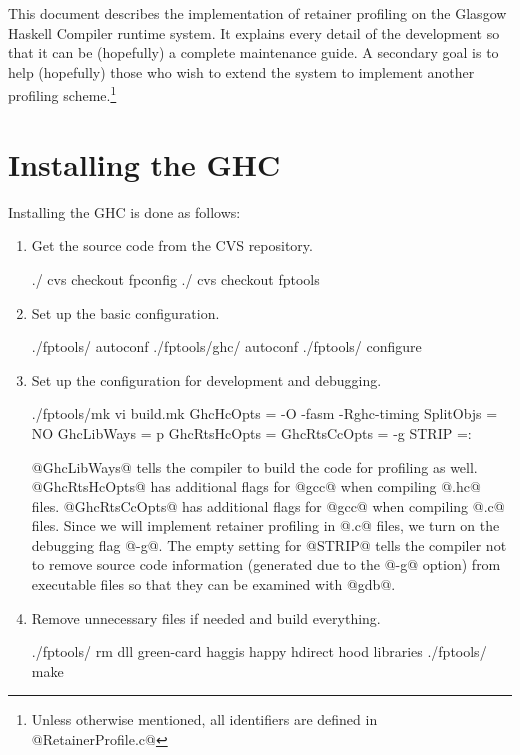 \documentclass{article}
\begin{document}
This document describes the implementation of retainer profiling on
the Glasgow Haskell Compiler runtime system. 
It explains every detail of the development so that it can be (hopefully)
a complete maintenance guide.
A secondary goal is to help (hopefully) those who wish to extend the system 
to implement another profiling scheme.\footnote{Unless otherwise mentioned,
all identifiers are defined in @RetainerProfile.c@}

\section{Installing the GHC}

Installing the GHC is done as follows:

\begin{enumerate}
\item Get the source code from the CVS repository.
\begin{code}
./              cvs checkout fpconfig
./              cvs checkout fptools
\end{code}

\item Set up the basic configuration.
\begin{code}
./fptools/      autoconf                    
./fptools/ghc/  autoconf
./fptools/      configure
\end{code}

\item Set up the configuration for development and debugging.
\begin{code}
./fptools/mk    vi build.mk
    GhcHcOpts = -O -fasm -Rghc-timing
    SplitObjs = NO
    GhcLibWays = p
    GhcRtsHcOpts = 
    GhcRtsCcOpts = -g
    STRIP =:
\end{code}
@GhcLibWays@ tells the compiler to build the code for profiling as well.
@GhcRtsHcOpts@ has additional flags for @gcc@ when compiling @.hc@ files.
@GhcRtsCcOpts@ has additional flags for @gcc@ when compiling @.c@ files.
Since we will implement retainer profiling in @.c@ files, we turn on the 
debugging flag @-g@. 
The empty setting for @STRIP@ tells the compiler not to remove source code
information (generated due to the @-g@ option) from executable files so that
they can be examined with @gdb@.

\item Remove unnecessary files if needed and build everything.
\begin{code}
./fptools/      rm dll green-card haggis happy hdirect hood libraries
./fptools/      make
\end{code}
\end{enumerate}
\end{document}
